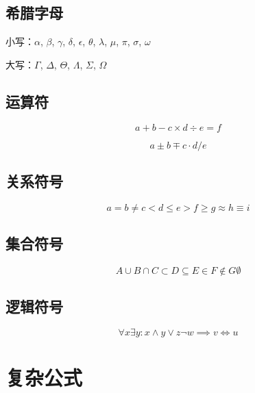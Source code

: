 \subsection{希腊字母}

小写：$\alpha$, $\beta$, $\gamma$, $\delta$, $\epsilon$, $\theta$, $\lambda$, $\mu$, $\pi$, $\sigma$, $\omega$

大写：$\Gamma$, $\Delta$, $\Theta$, $\Lambda$, $\Sigma$, $\Omega$

\subsection{运算符}

\begin{equation}
  a + b - c \times d \div e = f
\end{equation}

\begin{equation}
  a \pm b \mp c \cdot d / e
\end{equation}

\subsection{关系符号}

\begin{equation}
  a = b \neq c < d \leq e > f \geq g \approx h \equiv i
\end{equation}

\subsection{集合符号}

\begin{equation}
  A \cup B \cap C \subset D \subseteq E \in F \notin G \emptyset
\end{equation}

\subsection{逻辑符号}

\begin{equation}
  \forall x \exists y : x \land y \lor z \neg w \implies v \iff u
\end{equation}

\section{复杂公式}

